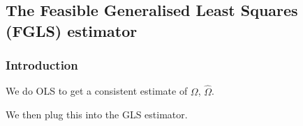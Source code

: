 
\subsection{The Feasible Generalised Least Squares (FGLS) estimator}

\subsubsection{Introduction}

We do OLS to get a consistent estimate of \(\Omega \), \(\hat \Omega \).

We then plug this into the GLS estimator.

